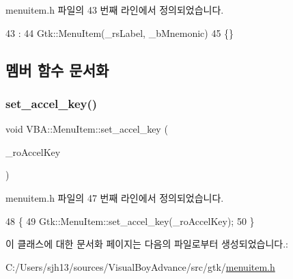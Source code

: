 menuitem.\+h 파일의 43 번째 라인에서 정의되었습니다.


\begin{DoxyCode}
43                                                                   :
44     Gtk::MenuItem(\_rsLabel, \_bMnemonic)
45     \{\}
\end{DoxyCode}


\subsection{멤버 함수 문서화}
\mbox{\label{class_v_b_a_1_1_menu_item_aa29889bacc86ccf386e0225b7f03e5be}} 
\subsubsection{\texorpdfstring{set\+\_\+accel\+\_\+key()}{set\_accel\_key()}}
{\footnotesize\ttfamily void V\+B\+A\+::\+Menu\+Item\+::set\+\_\+accel\+\_\+key (\begin{DoxyParamCaption}\item[{\mbox{\hyperlink{getopt1_8c_a2c212835823e3c54a8ab6d95c652660e}{const}} Gtk\+::\+Accel\+Key \&}]{\+\_\+ro\+Accel\+Key }\end{DoxyParamCaption})\hspace{0.3cm}{\ttfamily [inline]}}



menuitem.\+h 파일의 47 번째 라인에서 정의되었습니다.


\begin{DoxyCode}
48     \{
49       Gtk::MenuItem::set\_accel\_key(\_roAccelKey);
50     \}
\end{DoxyCode}


이 클래스에 대한 문서화 페이지는 다음의 파일로부터 생성되었습니다.\+:\begin{DoxyCompactItemize}
\item 
C\+:/\+Users/sjh13/sources/\+Visual\+Boy\+Advance/src/gtk/\mbox{\hyperlink{menuitem_8h}{menuitem.\+h}}\end{DoxyCompactItemize}

